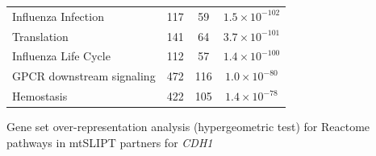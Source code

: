 \begin{table}[!ht]
{\begin{threeparttable}
\begin{tabular}{lccc}
  \rowcolor{black!5}
  Influenza Infection & 117 &  59 & $1.5 \times 10^{-102}$ \\ 
  \rowcolor{black!10}
  Translation & 141 &  64 & $3.7 \times 10^{-101}$ \\ 
  \rowcolor{black!5}
  Influenza Life Cycle & 112 &  57 & $1.4 \times 10^{-100}$ \\ 
  \rowcolor{black!10}
  GPCR downstream signaling & 472 & 116 & $1.0 \times 10^{-80}$ \\ 
  \rowcolor{black!5}
  Hemostasis & 422 & 105 & $1.4 \times 10^{-78}$ \\ 
  \hline
\end{tabular}
\begin{tablenotes}
\raggedright \small
Gene set over-representation analysis (hypergeometric test) for Reactome pathways in mtSLIPT partners for \textit{CDH1}
\end{tablenotes}
\end{threeparttable}
}
\end{table}


